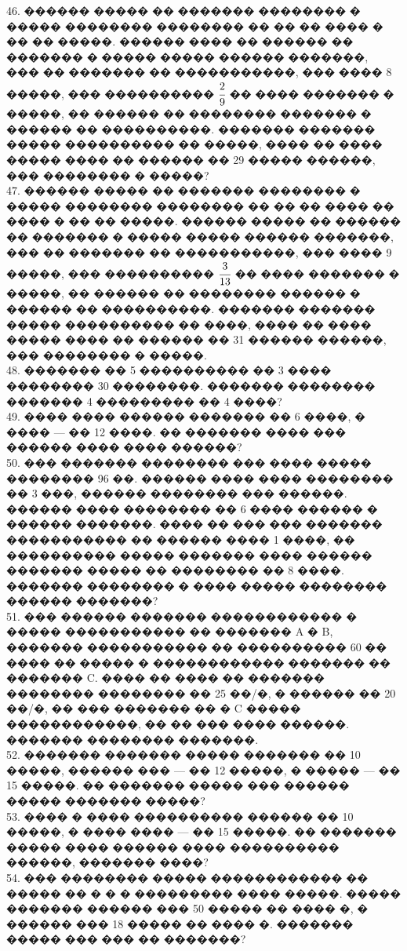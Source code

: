 \documentclass[12pt]{article}
\begin{document}
46. ������ ����� �� ������� �������� � ����� �������� �������� �� �� �� ���� � �� �� �����. ������ ���� �� ������ �� ������� � ����� ����� ������ �������, ��� �� ������� �� �����������, ��� ���� 8 �����, ��� ���������� $\cfrac{2}{9}$ �� ���� ������� � �����, �� ������ �� �������� ������� � ������ �� ����������. ������� ������� ����� ���������� �� �����, ���� �� ���� ����� ���� �� ������ �� 29 ����� ������, ��� �������� � �����?\\
47. ������ ����� �� ������� �������� � ����� �������� �������� �� �� �� ���� �� ���� � �� �� �����. ������ ����� �� ������ �� ������� � ����� ����� ������ �������, ��� �� ������� �� �����������, ��� ���� 9 �����, ��� ���������� $\cfrac{3}{13}$ �� ���� ������� � �����, �� ������ �� �������� ������ � ������ �� ����������. ������� ������� ����� ���������� �� ����, ���� �� ���� ����� ���� �� ������ �� 31 ������ ������, ��� �������� � �����.\\
48. ������� �� 5 ���������� �� 3 ���� �������� 30 ��������. ������� �������� ������� 4 ��������� �� 4 ����?\\
49. ���� ���� ������ ������� �� 6 ����, � ���� --- �� 12 ����. �� ������� ���� ��� ������ ���� ���� ������?\\
50. ��� ������� �������� ��� ���� ����� �������� 96 ��. ������ ���� ���� �������� �� 3 ���, ������ �������� ��� ������. ������ ���� �������� �� 6 ���� ������ � ������ �������. ���� �� ��� ��� ������� ����������� �� ������ ���� 1 ����, �� ���������� ����� ������� ���� ������ ������� ����� �� �������� �� 8 ����. ������� �������� � ���� ����� �������� ������ �������?\\
51. ��� ������ ������� ������������ � ����� ����������� �� ������� A � B, ������� ����������� �� ���������� 60 �� ���� �� ����� � ������������ ������� �� ������� C. ���� �� ���� �� ������� �������� �������� �� 25 ��/�, � ������ �� 20 ��/�, �� ��� ������� �� � C ����� ������������, �� �� ��� ���� ������. ������� �������� �������.\\
52. ������� ������� ����� ������� �� 10 �����, ������ ��� --- �� 12 �����, � ����� --- �� 15 �����. �� ������� ����� ��� ������ ����� ������� �����?\\
53. ���� � ���� ���������� ������ �� 10 �����, � ���� ���� --- �� 15 �����. �� ������� ����� ���� ������ ���� ���������� ������, ������� ����?\\
54. ��� �������� ����� ������������ �� ����� �� � � � ��������� ���� �����. ����� ������� ������ ��� 50 ����� �� ���� �, � ������ ��� 18 ����� �� ���� �. ������� ����� ��� ��� �� �������?\\
\end{document}
